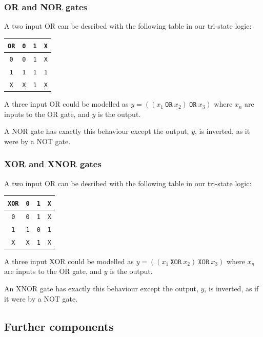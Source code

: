 \documentclass[12pt, a4paper, oneside,titlepage]{article}
\begin{document}
\subsubsection{OR and NOR gates}
A two input OR can be desribed with the following table in our tri-state logic:
\begin{center}
\begin{tabular}{c |l  l l}
\texttt{OR} & \texttt{0} & \texttt{1} & \texttt{X}\\
\hline
\texttt{0} & \texttt{0} & \texttt{1} & \texttt{X}\\
\hline
\texttt{1} & \texttt{1} & \texttt{1} & \texttt{1}\\
\hline
\texttt{X} & \texttt{X} & \texttt{1} & \texttt{X}\\
\hline
\end{tabular}
\end{center}
A three input OR could be modelled as $y = ((x_1\ \texttt{OR}\ x_2)\ \texttt{OR}\ x_3)$ where $x_n$ are inputs to the OR gate, and $y$ is the output. 

A NOR gate has exactly this behaviour except the output, $y$, is inverted, as it were by a NOT gate. 

\subsubsection{XOR and XNOR gates}
A two input OR can be desribed with the following table in our tri-state logic:
\begin{center}
\begin{tabular}{c |l  l l}
\texttt{XOR} & \texttt{0} & \texttt{1} & \texttt{X}\\
\hline
\texttt{0} & \texttt{0} & \texttt{1} & \texttt{X}\\
\hline
\texttt{1} & \texttt{1} & \texttt{0} & \texttt{1}\\
\hline
\texttt{X} & \texttt{X} & \texttt{1} & \texttt{X}\\
\hline
\end{tabular}
\end{center}
A three input XOR could be modelled as $y = ((x_1\ \texttt{XOR}\ x_2)\ \texttt{XOR}\ x_3)$ where $x_n$ are inputs to the OR gate, and $y$ is the output. 

An XNOR gate has exactly this behaviour except the output, $y$, is inverted, as if it were by a NOT gate. 

\subsection{Further components}
\end{document}
